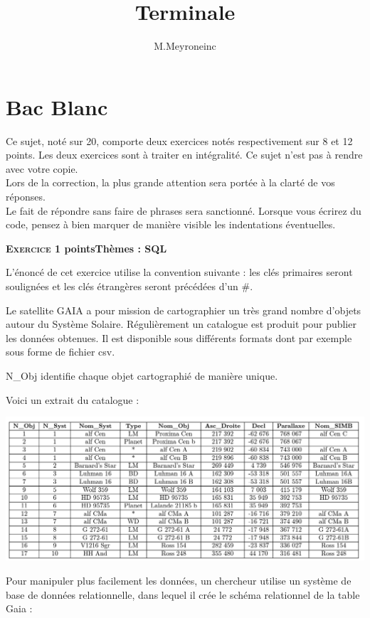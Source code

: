 \documentclass[12pt]{book}
\author{M.Meyroneinc}
\title{Terminale}
\begin{document}
	\setcounter{chapter}{6}

\bilan	
{}

\chapter{Bac Blanc}

\vspace{0,25cm}

Ce sujet, noté sur 20, comporte deux exercices notés respectivement sur 8 et 12 points. 
Les deux exercices sont à traiter en intégralité. Ce sujet n’est pas à rendre avec votre copie.\\
Lors de la correction, la plus grande attention sera portée à la clarté de vos réponses.\\ Le fait de répondre sans faire de phrases sera sanctionné.   Lorsque vous écrirez du code, pensez à bien marquer de manière visible les indentations éventuelles.


\medskip
\bigskip

\textbf{\textsc{Exercice 1}  points\hfill Thèmes : SQL}

\bigskip

L’énoncé de cet exercice utilise la convention suivante : les clés primaires seront soulignées et les clés étrangères seront précédées d’un $\#$.  

Le satellite GAIA a pour mission de cartographier un très grand nombre d’objets autour du Système Solaire. Régulièrement un catalogue est produit
pour publier les données obtenues. Il est disponible sous différents formats dont par exemple sous forme de fichier csv.  

N\_Obj identifie chaque objet cartographié de manière unique. 

Voici un extrait du catalogue :


\includegraphics[scale=0.45]{data/bacblancsql.png} 

Pour manipuler plus facilement les données, un chercheur utilise un système de base de données relationnelle, dans lequel il crée le schéma relationnel de la table Gaia :  
\end{document}
